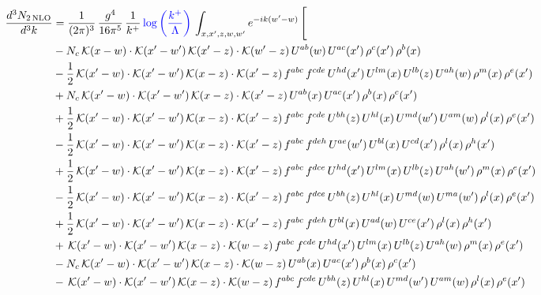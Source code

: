 \documentclass[9pt]{article}
\numberwithin{equation}{section}
\begin{document}
\begin{align}
\frac{d^{3}N_{2\,\mathrm{NLO}}}{d^{3}k} & = \frac{1}{(2\pi)^{3}}\,\frac{g^{4}}{16\pi^{5}}\,\frac{1}{k^{+}}\,{\color{blue}\log{\left(\frac{k^{+}}{\Lambda}\right)}}\,\int_{x,x',z,w,w'}e^{-ik(w'-w)}\,\Bigg[\notag\\ & -N_{c}\,\mathcal{K}(x-w)\cdot\mathcal{K}(x'-w')\,\mathcal{K}(x'-z)\cdot\mathcal{K}(w'-z)\,U^{ab}(w)\,U^{ac}(x')\,\rho^{c}(x')\,\rho^{b}(x)\notag\\
& -\frac{1}{2}\,\mathcal{K}(x'-w)\cdot\mathcal{K}(x'-w')\,\mathcal{K}(x-z)\cdot\mathcal{K}(x'-z)\,f^{abc}\,f^{cde}\,U^{hd}(x')\,U^{lm}(x)\,U^{lb}(z)\,U^{ah}(w)\,\rho^{m}(x)\,\rho^{e}(x')\notag\\
& +N_{c}\,\mathcal{K}(x'-w)\cdot\mathcal{K}(x'-w')\,\mathcal{K}(x-z)\cdot\mathcal{K}(x'-z)\,U^{ab}(x)\,U^{ac}(x')\,\rho^{b}(x)\,\rho^{c}(x')\notag\\
& +\frac{1}{2}\,\mathcal{K}(x'-w)\cdot\mathcal{K}(x'-w')\,\mathcal{K}(x-z)\cdot\mathcal{K}(x'-z)\,f^{abc}\,f^{cde}\,U^{bh}(z)\,U^{hl}(x)\,U^{md}(w')\,U^{am}(w)\,\rho^{l}(x)\,\rho^{e}(x')\notag\\
& -\frac{1}{2}\,\mathcal{K}(x'-w)\cdot\mathcal{K}(x'-w')\,\mathcal{K}(x-z)\cdot\mathcal{K}(x'-z)\,f^{abc}\,f^{deh}\,U^{ae}(w')\,U^{bl}(x)\,U^{cd}(x')\,\rho^{l}(x)\,\rho^{h}(x')\notag \\ & +\frac{1}{2}\,\mathcal{K}(x'-w)\cdot\mathcal{K}(x'-w')\,\mathcal{K}(x-z)\cdot\mathcal{K}(x'-z)\,f^{abc}\,f^{dce}\,U^{hd}(x')\,U^{lm}(x)\,U^{lb}(z)\,U^{ah}(w')\,\rho^{m}(x)\,\rho^{e}(x')\notag\\
& -\frac{1}{2}\,\mathcal{K}(x'-w)\cdot\mathcal{K}(x'-w')\,\mathcal{K}(x-z)\cdot\mathcal{K}(x'-z)\,f^{abc}\,f^{dce}\,U^{bh}(z)\,U^{hl}(x)\,U^{md}(w)\,U^{ma}(w')\,\rho^{l}(x)\,\rho^{e}(x')\notag\\
& +\frac{1}{2}\,\mathcal{K}(x'-w)\cdot\mathcal{K}(x'-w')\,\mathcal{K}(x-z)\cdot\mathcal{K}(x'-z)\,f^{abc}\,f^{deh}\,U^{bl}(x)\,U^{ad}(w)\,U^{ce}(x')\,\rho^{l}(x)\,\rho^{h}(x')\notag\\
& +\,\mathcal{K}(x'-w)\cdot\mathcal{K}(x'-w')\,\mathcal{K}(x-z)\cdot\mathcal{K}(w-z)\,f^{abc}\,f^{cde}\,U^{hd}(x')\,U^{lm}(x)\,U^{lb}(z)\,U^{ah}(w)\,\rho^{m}(x)\,\rho^{e}(x')\notag\\
& -N_{c}\,\mathcal{K}(x'-w)\cdot\mathcal{K}(x'-w')\,\mathcal{K}(x-z)\cdot\mathcal{K}(w-z)\,U^{ab}(x)\,U^{ac}(x')\,\rho^{b}(x)\,\rho^{c}(x')\notag\\
& -\,\mathcal{K}(x'-w)\cdot\mathcal{K}(x'-w')\,\mathcal{K}(x-z)\cdot\mathcal{K}(w-z)\,f^{abc}\,f^{cde}\,U^{bh}(z)\,U^{hl}(x)\,U^{md}(w')\,U^{am}(w)\,\rho^{l}(x)\,\rho^{e}(x')\notag\\

\end{align}
\end{document}
